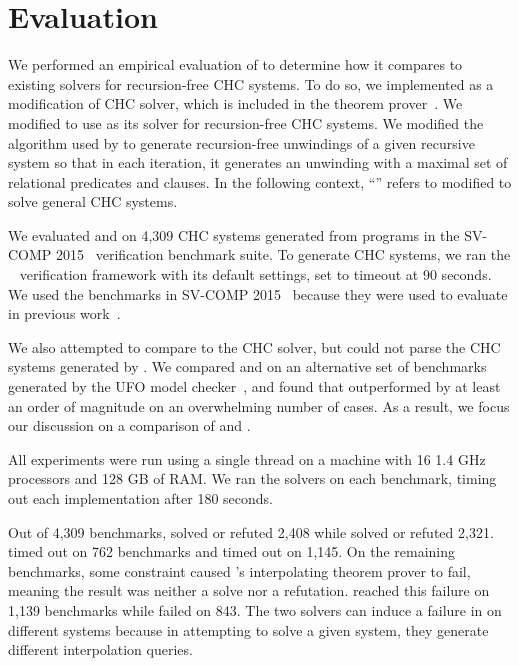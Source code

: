 \section{Evaluation}
\label{sec:evaluation}
We performed an empirical evaluation of \sys to determine how it
compares to existing solvers for recursion-free CHC systems.
%
To do so, we implemented \sys as a modification of \duality CHC
solver, which is included in the \zthree theorem prover~\cite{z3}.
%
We modified \duality to use \sys as its solver for recursion-free CHC
systems.
%
We modified the algorithm used by \duality to generate recursion-free
unwindings of a given recursive system so that in each iteration, it
generates an unwinding with a maximal set of relational predicates and
clauses.
%
In the following context, ``\sys'' refers to \duality modified to
solve general CHC systems.

We evaluated \sys and \duality on 4,309 CHC systems generated from
programs in the SV-COMP 2015~\cite{svcomp15} verification benchmark
suite.
%
To generate CHC systems, we ran the \seahorn~\cite{gurfinkel15}
verification framework with its default settings, set to timeout at 90
seconds.
%
We used the benchmarks in SV-COMP 2015~\cite{svcomp15} because they
were used to evaluate \duality in previous work~\cite{mcmillan14}.

We also attempted to compare \sys to the \eldarica CHC solver, but
\eldarica could not parse the CHC systems generated by \seahorn.
%
We compared \sys and \eldarica on an alternative set of benchmarks
generated by the UFO model checker~\cite{albarghouthi12c}, and found
that \sys outperformed \eldarica by at least an order of magnitude on
an overwhelming number of cases.
%
As a result, we focus our discussion on a comparison of \sys and
\duality.

All experiments were run using a single thread 
on a machine with 16 1.4 GHz processors and
128 GB of RAM.
%
We ran the solvers on each benchmark, timing out each implementation
after 180 seconds.

Out of 4,309 benchmarks, \sys solved or refuted 2,408 while \duality
solved or refuted 2,321. \sys timed out on 762 benchmarks and \duality
timed out on 1,145.
%
On the remaining benchmarks, some constraint caused \zthree's
interpolating theorem prover to fail, meaning the result was neither a
solve nor a refutation. \sys reached this failure on 1,139 benchmarks
while \duality failed on 843.
%
The two solvers can induce a failure in \zthree on different systems
because in attempting to solve a given system, they generate different
interpolation queries.


